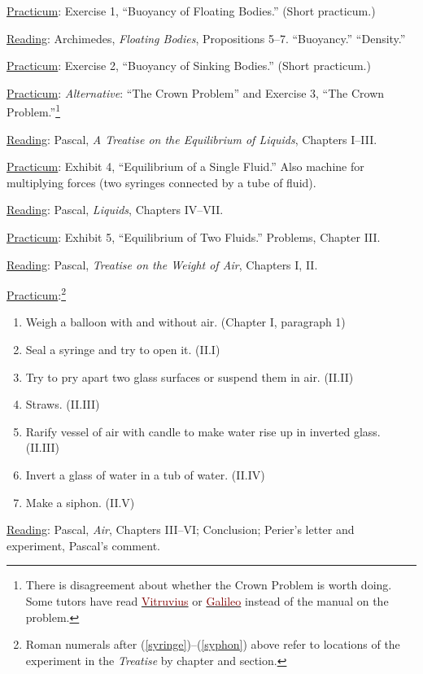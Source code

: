 \documentclass{article}
\newcommand{\rd}{\uline{Reading}}
\newcommand{\pc}{\uline{Practicum}}
\begin{document}
\begin{enumerate}
	\pc: Exercise 1, ``Buoyancy of Floating Bodies.'' (Short practicum.)

\item \rd:  Archimedes, \emph{Floating Bodies}, Propositions 5--7. ``Buoyancy.'' ``Density.'' 

	\pc: Exercise 2, ``Buoyancy of Sinking Bodies.'' (Short practicum.)

	\pc: \emph{Alternative}: ``The Crown Problem'' and Exercise 3, ``The Crown Problem.''\footnote{There is disagreement about whether the Crown Problem is worth doing. Some tutors have read \href{https://sjca.sharepoint.com/:b:/r/sites/Departments/Faculty/Documents/Annapolis/Freshman\%20Lab/Schedule\%20and\%20files/The\%20Golden\%20Crown\%20as\%20described\%20in\%20The\%20Ten\%20Books\%20on\%20Architecture\%20by\%20Marcus\%20Vitruvius\%20Pollio.pdf?csf=1&web=1&e=6rXZMT}{\textcolor{Maroon}{Vitruvius}} or \href{https://sjca.sharepoint.com/:b:/r/sites/Departments/Faculty/Documents/Annapolis/Freshman\%20Lab/Schedule\%20and\%20files/08.5\%20Galileo\%20Little\%20Balance\%202025-01-11\%2016_59_26.pdf?csf=1&web=1&e=N4DMaE}{\textcolor{Maroon}{Galileo}} instead of the manual on the problem.}


\item \rd:  Pascal, \emph{A Treatise on the Equilibrium of Liquids}, Chapters I--III. 

	\pc: Exhibit 4, ``Equilibrium of a Single Fluid.'' Also machine for multiplying forces (two syringes connected by a tube of fluid). 

\item \rd:  Pascal, \emph{Liquids}, Chapters IV--VII. 

	\pc: Exhibit 5, ``Equilibrium of Two Fluids.'' Problems, Chapter III.

\begin{minipage}{0.9\textwidth}
\item \rd:  Pascal, \emph{Treatise on the Weight of Air}, Chapters I, II. 

	\pc:\footnote{Roman numerals after (\ref{syringe})--(\ref{syphon}) above refer to locations of the experiment in the \emph{Treatise} by
	chapter and section.}
	\begin{enumerate}[nosep]
		\item Weigh a balloon with and without air. (Chapter I, paragraph 1)
		\item Seal a syringe and try to open it. (II.I)\label{syringe}
		\item Try to pry apart two glass surfaces or suspend them in air. (II.II)
		\item Straws. (II.III)
		\item Rarify vessel of air with candle to make water rise up in inverted glass. (II.III)
		\item Invert a glass of water in a tub of water. (II.IV)
		\item Make a siphon. (II.V)\label{syphon}
	\end{enumerate}
	\end{minipage}
\item \rd:\label{air}  Pascal, \emph{Air}, Chapters III--VI; Conclusion; Perier’s letter
and experiment, Pascal’s comment.
  

\end{enumerate}
\end{document}
